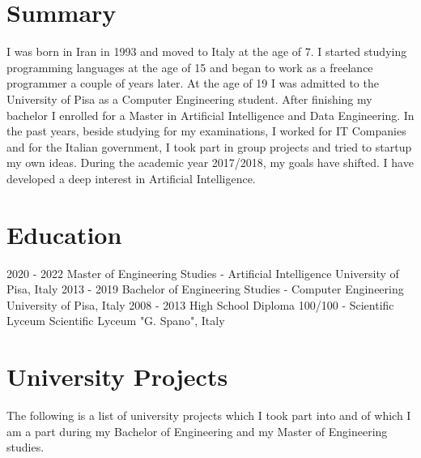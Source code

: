 \documentclass[]{friggeri-cv}
\begin{document}
\section{Summary}
\vspace{-3mm}
I was born in Iran in 1993 and moved to Italy at the age of 7. I started
studying programming languages at the age of 15 and began to work as a freelance
programmer a couple of years later. At the age of 19 I was admitted to the
University of Pisa as a Computer Engineering student. After finishing my
bachelor I enrolled for a Master in Artificial Intelligence and Data
Engineering. In the past years, beside studying for my examinations, I worked
for IT Companies and for the Italian government, I took part in group projects
and tried to startup my own ideas. During the academic year 2017/2018, my goals
have shifted. I have developed a deep interest in Artificial Intelligence.


\section{Education}
\vspace{-3mm}
\begin{entrylist}
\entry
{2020 - 2022}
{Master {\normalfont\small{of Engineering Studies - Artificial Intelligence}}}
{University of Pisa, Italy}
{\vspace{-3mm}}
\entry
{2013 - 2019}
{Bachelor {\normalfont\small{of Engineering Studies - Computer Engineering}}}
{University of Pisa, Italy}
{\vspace{-3mm}}
\entry
{2008 - 2013}
{High School Diploma {\normalfont\small{100/100 - Scientific Lyceum}}}
{Scientific Lyceum "G. Spano", Italy}
{\vspace{-5mm}}
\end{entrylist}

\patchcmd{\entry}{14.8cm}{11.8cm}{}{}
\section{University Projects}
\vspace{-3mm}
The following is a list of university projects which I took part into and of
which I am a part during my Bachelor of Engineering and my Master of Engineering
studies.
\end{document}
